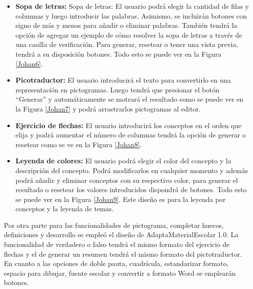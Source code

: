 \begin{itemize}
  \item \textbf{Sopa de letras:} Sopa de letras: El usuario podrá elegir la cantidad de filas y columnas y luego introducir las palabras. Asimismo, se incluirán botones con signo de más y menos para añadir o eliminar palabras. También tendrá la opción de agregar un ejemplo de cómo resolver la sopa de letras a través de una casilla de verificación. Para generar, resetear o tener una vista previa, tendrá a su disposición botones. Todo esto se puede ver en la Figura \ref{Johan6}.
  \item \textbf{Picotraductor:} El usuario introducirá el texto para convertirlo en una representación en pictogramas. Luego tendrá que presionar el botón ``Generar'' y automáticamente se motrará el resultado como se puede ver en la Figura \ref{Johan7} y podrá arrastrarlos pictogramas al editor.
  \item \textbf{Ejercicio de flechas:} El usuario introducirá los conceptos en el orden que elija y podrá aumentar el número de columnas tendrá la opción de generar o resetear como se ve en la Figura \ref{Johan8}.
  \item  \textbf{Leyenda de colores:} El usuario podrá elegir el color del concepto y la descripción del concepto. Podrá modificarlos en cualquier momento y además podrá añadir y eliminar conceptos con su respectivo color, para generar el resultado o resetear los valores introducidos dispondrá de botones. Todo esto se puede ver en la Figura \ref{Johan9}. Este diseño es para la leyenda por conceptos y la leyenda de temas.
\end{itemize}

Por otra parte para las funcionalidades de pictograma, completar huecos, definiciones y desarrollo se empleó el diseño de AdaptaMaterialEscolar 1.0. La funcionalidad de verdadero o falso tendrá el mismo formato del ejercicio de flechas y el de generar un resumen tendrá el mismo formato del pictotraductor. En cuanto a las opciones de doble pauta, cuadrícula, estandarizar formato, espacio para dibujar, fuente escolar y convertir a formato Word se emplearán botones.

